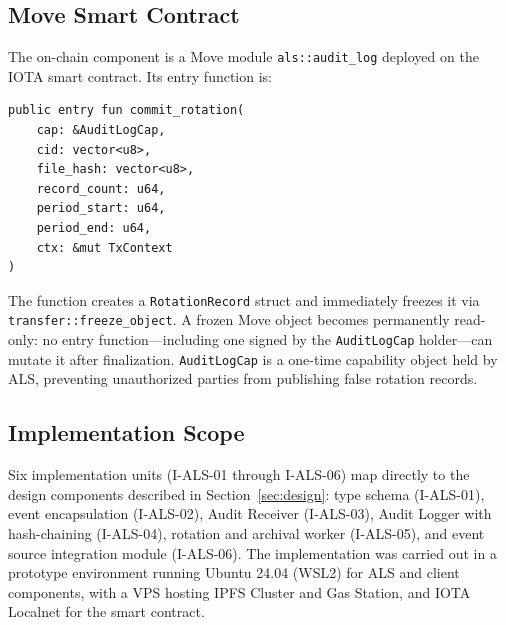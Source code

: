 \subsection{Move Smart Contract}

The on-chain component is a Move module \texttt{als::audit\_log} deployed
on the IOTA smart contract. Its entry function is:

\begin{verbatim}
public entry fun commit_rotation(
    cap: &AuditLogCap,
    cid: vector<u8>,
    file_hash: vector<u8>,
    record_count: u64,
    period_start: u64,
    period_end: u64,
    ctx: &mut TxContext
)
\end{verbatim}

The function creates a \texttt{RotationRecord} struct and immediately freezes
it via \texttt{transfer::freeze\_object}. A frozen Move object becomes
permanently read-only: no entry function---including one signed by the
\texttt{AuditLogCap} holder---can mutate it after finalization.
\texttt{AuditLogCap} is a one-time capability object held by ALS, preventing
unauthorized parties from publishing false rotation records.

\subsection{Implementation Scope}

Six implementation units (I-ALS-01 through I-ALS-06) map directly to the
design components described in Section~\ref{sec:design}: type schema
(I-ALS-01), event encapsulation (I-ALS-02), Audit Receiver (I-ALS-03),
Audit Logger with hash-chaining (I-ALS-04), rotation and archival worker
(I-ALS-05), and event source integration module (I-ALS-06). The
implementation was carried out in a prototype environment running Ubuntu
24.04 (WSL2) for ALS and client components, with a VPS hosting IPFS Cluster
and Gas Station, and IOTA Localnet for the smart contract.